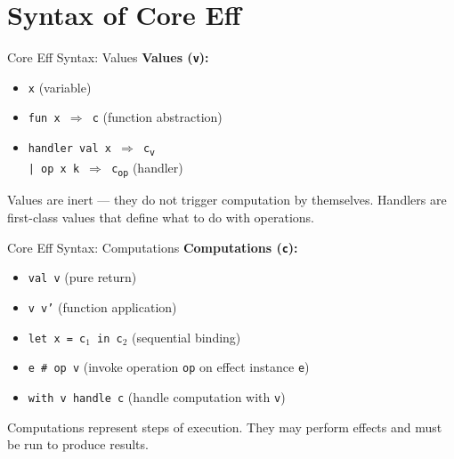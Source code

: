\section{Syntax of Core Eff}
\begin{frame}{Core Eff Syntax: Values}
\textbf{Values (\texttt{v}):}
\begin{itemize}
  \item \texttt{x} \hfill (variable)
  \item \texttt{fun x $\Rightarrow$ c} \hfill (function abstraction)
  \item \texttt{handler val x $\Rightarrow$ c\textsubscript{v} \\
  \hspace{3.5em} | op x k $\Rightarrow$ c\textsubscript{op}} \hfill (handler)
\end{itemize}

\vspace{1em}
Values are inert — they do not trigger computation by themselves.  
Handlers are first-class values that define what to do with operations.
\end{frame}
\begin{frame}{Core Eff Syntax: Computations}
\textbf{Computations (\texttt{c}):}
\begin{itemize}
  \item \texttt{val v} \hfill (pure return)
  \item \texttt{v v'} \hfill (function application)
  \item \texttt{let x = c$_1$ in c$_2$} \hfill (sequential binding)
  \item \texttt{e \# op v} \hfill (invoke operation \texttt{op} on effect instance \texttt{e})
  \item \texttt{with v handle c} \hfill (handle computation with \texttt{v})
\end{itemize}

\vspace{1em}
Computations represent steps of execution.  
They may perform effects and must be run to produce results.
\end{frame}


